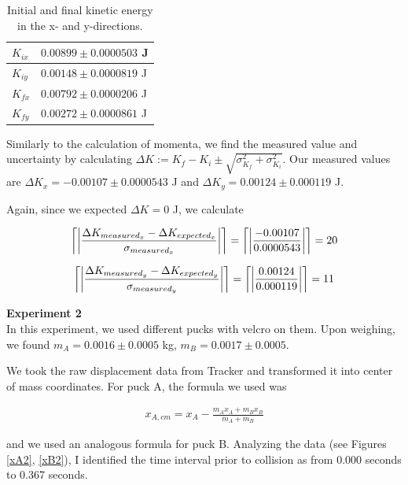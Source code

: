\documentclass[11pt]{article}
\DeclarePairedDelimiter{\ceil}{\lceil}{\rceil}
\begin{document}
\begin{table}[]
\centering
\caption{Initial and final kinetic energy in the x- and y-directions.}
\label{tabkin}
\begin{tabular}{|l|l|}
\hline
$K_{ix}$ & $0.00899\pm0.0000503$ J  \\ \hline
$K_{iy}$ & $0.00148\pm 0.0000819$ J \\ \hline
$K_{fx}$ & $0.00792\pm 0.0000206$  J \\ \hline
$K_{fy}$ & $0.00272 \pm 0.0000861$  J\\ \hline
\end{tabular}
\end{table}

Similarly to the calculation of momenta, we find the measured value and uncertainty by calculating $\Delta K := K_{f}-K_{i} \pm \sqrt{\sigma_{K_{f}}^2+\sigma_{K_{i}}^2}$. Our measured values are $\Delta K_x = -0.00107 \pm 0.0000543$ J and $\Delta K_y = 0.00124\pm 0.000119$ J.

Again, since we expected $\Delta K = 0$ J, we calculate

\begin{align}
\ceil*{\left\vert\frac{\Delta K_{measured_x}-\Delta K_{expected_x}}{\sigma_{measured_x}}\right\vert} = \ceil*{\left\vert\frac{-0.00107}{0.0000543}\right\vert} = 20
\label{errKx}
\end{align}

\begin{align}
\ceil*{\left\vert\frac{\Delta K_{measured_y}-\Delta K_{expected_y}}{\sigma_{measured_y}}\right\vert} = \ceil*{\left\vert\frac{0.00124}{0.000119}\right\vert} = 11
\label{errKy}
\end{align}


{\bf Experiment 2}\\

In this experiment, we used different pucks with velcro on them. Upon weighing, we found $m_A = 0.0016 \pm 0.0005$ kg, $m_B = 0.0017 \pm 0.0005$.

We took the raw displacement data from Tracker and transformed it into center of mass coordinates. For puck A, the formula we used was

\begin{align}
x_{A,cm}=x_A-\frac{m_A x_A+ m_B x_B}{m_A + m_B}
\end{align}

and we used an analogous formula for puck B. Analyzing the data (see Figures \ref{xA2}, \ref{xB2}), I identified the time interval prior to collision as from 0.000 seconds to 0.367 seconds. 
\end{document}
